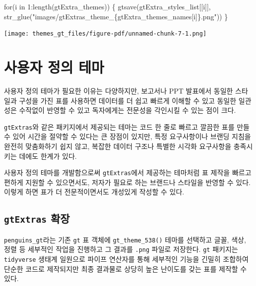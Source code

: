 \documentclass[
  letterpaper,
]{book}
\newenvironment{Shaded}{\begin{snugshade}}{\end{snugshade}}
\newcommand{\ControlFlowTok}[1]{\textcolor[rgb]{0.00,0.23,0.31}{#1}}
\newcommand{\DecValTok}[1]{\textcolor[rgb]{0.68,0.00,0.00}{#1}}
\newcommand{\FunctionTok}[1]{\textcolor[rgb]{0.28,0.35,0.67}{#1}}
\newcommand{\NormalTok}[1]{\textcolor[rgb]{0.00,0.23,0.31}{#1}}
\newcommand{\SpecialCharTok}[1]{\textcolor[rgb]{0.37,0.37,0.37}{#1}}
\newcommand{\StringTok}[1]{\textcolor[rgb]{0.13,0.47,0.30}{#1}}
\begin{document}
\begin{Shaded}
\begin{Highlighting}[]
\ControlFlowTok{for}\NormalTok{(i }\ControlFlowTok{in} \DecValTok{1}\SpecialCharTok{:}\FunctionTok{length}\NormalTok{(gtExtra\_themes)) \{}
  \FunctionTok{gtsave}\NormalTok{(gtExtra\_styles\_list[[i]],}
         \FunctionTok{str\_glue}\NormalTok{(}\StringTok{"images/gtExtras\_theme\_\{gtExtra\_themes\_names[i]\}.png"}\NormalTok{))}
\NormalTok{\}}
\end{Highlighting}
\end{Shaded}

\texttt{[image: themes\_gt\_files/figure-pdf/unnamed-chunk-7-1.png]}

\hypertarget{uxc0acuxc6a9uxc790-uxc815uxc758-uxd14cuxb9c8}{%
\section{사용자 정의
테마}\label{uxc0acuxc6a9uxc790-uxc815uxc758-uxd14cuxb9c8}}

사용자 정의 테마가 필요한 이유는 다양하지만, 보고서나 PPT 발표에서
동일한 스타일과 구성을 가진 표를 사용하면 데이터를 더 쉽고 빠르게 이해할
수 있고 동일한 일관성은 수작없이 반영할 수 있고 독자에게는 전문성을
각인시킬 수 있는 점이 크다.

\texttt{gtExtras}와 같은 패키지에서 제공되는 테마는 코드 한 줄로 빠르고
깔끔한 표를 만들 수 있어 시간을 절약할 수 있다는 큰 장점이 있지만, 특정
요구사항이나 브랜딩 지침을 완전히 맞춤화하기 쉽지 않고, 복잡한 데이터
구조나 특별한 시각화 요구사항을 충족시키는 데에도 한계가 있다.

사용자 정의 테마를 개발함으로써 \texttt{gtExtras}에서 제공하는 테마처럼
표 제작을 빠르고 편하게 지원할 수 있으면서도, 저자가 필요로 하는
브랜드나 스타일을 반영할 수 있다. 이렇게 하면 표가 더 전문적이면서도
개성있게 작성할 수 있다.

\hypertarget{gtextras-uxd655uxc7a5}{%
\subsection{\texorpdfstring{\texttt{gtExtras}
확장}{gtExtras 확장}}\label{gtextras-uxd655uxc7a5}}

\texttt{penguins\_gt}라는 기존 \texttt{gt} 표 객체에
\texttt{gt\_theme\_538()} 테마를 선택하고 글꼴, 색상, 정렬 등 세부적인
작업을 진행하고 그 결과를 \texttt{.png} 파일로 저장한다. \texttt{gt}
패키지는 \texttt{tidyverse} 생태계 일원으로 파이프 연산자를 통해
세부적인 기능을 긴밀히 조합하여 단순한 코드로 제작되지만 최종 결과물로
상당히 높은 난이도를 갖는 표를 제작할 수 있다.
\end{document}
